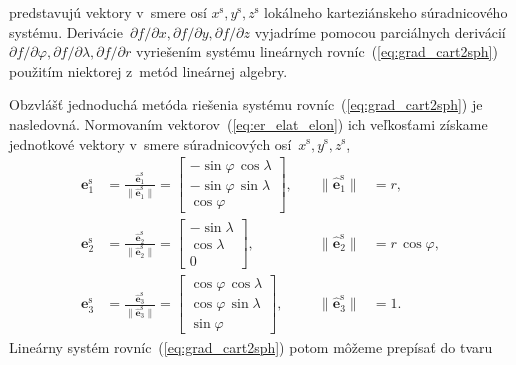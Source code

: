 \documentclass[a4paper, 12pt]{book}
\let\vec\mathbf
\begin{document}
%
predstavujú vektory v~smere osí $x^{\mathrm{s}}, y^{\mathrm{s}}, 
z^{\mathrm{s}}$ lokálneho karteziánskeho súradnicového systému.  
Derivácie~$\partial f \slash \partial x, \partial f \slash \partial y, \partial 
f \slash \partial z$ vyjadríme pomocou parciálnych derivácií $\partial f \slash 
\partial \varphi, \partial f \slash \partial \lambda, \partial f \slash 
\partial r$ vyriešením systému lineárnych rovníc~(\ref{eq:grad_cart2sph}) 
použitím niektorej z~metód lineárnej algebry.

Obzvlášť jednoduchá metóda riešenia systému rovníc~(\ref{eq:grad_cart2sph}) je 
nasledovná.  Normovaním vektorov~(\ref{eq:er_elat_elon}) ich veľkosťami získame 
jednotkové vektory v~smere súradnicových osí~$x^\mathrm{s}, y^\mathrm{s}, 
z^\mathrm{s}$,
%
\begin{equation}
\label{eq:er_elat_elon_unit}
\begin{aligned}
%
\vec e^\mathrm{s}_1 &= \frac{\hat{\vec e}_1^\mathrm{s}}{\| \hat{\vec 
e}_1^\mathrm{s} \|} = 
%
\begin{bmatrix}
-\sin\varphi \, \cos\lambda\\
-\sin\varphi \, \sin\lambda\\
\cos\varphi
\end{bmatrix}
%
{,} \quad &\| \hat{\vec e}_1^\mathrm{s} \| &= r{,}\\
%
\vec e^\mathrm{s}_2 &= \frac{\hat{\vec e}_2^\mathrm{s}}{\| \hat{\vec 
e}_2^\mathrm{s} \|} = 
%
\begin{bmatrix}
-\sin\lambda\\
\cos\lambda\\
0
\end{bmatrix}
%
{,}  \quad &\| \hat{\vec e}_2^\mathrm{s} \| &= r \, \cos\varphi{,}\\
%
\vec e^\mathrm{s}_3 &= \frac{\hat{\vec e}_3^\mathrm{s}}{\| \hat{\vec 
e}_3^\mathrm{s} \|} = 
%
\begin{bmatrix}
\cos\varphi \, \cos\lambda\\
\cos\varphi \, \sin\lambda\\
\sin\varphi
\end{bmatrix}
%
{,} \quad &\| \hat{\vec e}_3^\mathrm{s} \| &= 1{.}
%
\end{aligned}
\end{equation}
%
Lineárny systém rovníc~(\ref{eq:grad_cart2sph}) potom môžeme prepísať do tvaru
%
\end{document}

